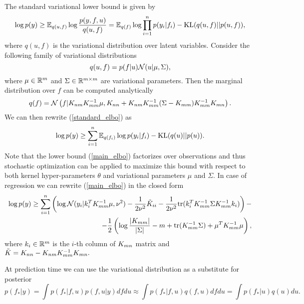   The standard variational lower bound is given by
  \begin{equation}
  \label{standard_elbo}
    \log p(y) \ge \mathbb{E}_{q(u, f)} \log \frac {p(y, f, u)} {q(u, f)} =
    \mathbb{E}_{q(f)} \log \prod_{i=1}^n p(y_i | f_i) - \mbox{KL}(q(u, f) || p(u, f)),
  \end{equation}
  where $q(u, f)$ is the variational distribution over latent variables.
  Consider the following family of variational distributions
  \begin{equation}
  \label{var_family}
    q(u, f) = p(f | u) \mathcal{N}(u | \mu, \Sigma),
  \end{equation}
  where $\mu \in \mathbb{R}^m$ and $\Sigma \in \mathbb{R}^{m \times m}$ are variational
  parameters. Then the marginal distribution over $f$ can be computed analytically
  \[
    q(f) = \mathcal{N}\left(f | K_{nm} K_{mm}^{-1} \mu, K_{nn} + K_{nm} K_{mm}^{-1} (\Sigma - K_{mm}) K_{mm}^{-1} K_{mn}\right).
  \]
  We can then rewrite (\ref{standard_elbo}) as
  \vspace{-0.3cm}
  \begin{equation}
  \label{main_elbo}
    \log p(y) \ge \sum_{i=1}^n \mathbb{E}_{q(f_i)} \log p(y_i | f_i) - \mbox{KL}(q(u) || p(u)).
  \end{equation}
  Note that the lower bound (\ref{main_elbo}) factorizes over observations and
  thus stochastic optimization can be applied to maximize this bound with respect
  to both kernel hyper-parameters $\theta$ and variational parameters $\mu$ and
  $\Sigma$. In case of regression we can rewrite (\ref{main_elbo}) in the closed
  form
  \begin{equation}
    \label{elbo_reg}
    \begin{split}
      \log p(y) \ge
      \sum_{i=1}^n \left ( \log \mathcal{N} (y_i | k_{i}^T K_{mm}^{-1} \mu, \nu^2) -
        \frac 1 {2\nu^2} \tilde K_{ii} -
        \frac 1 {2\nu^2} \mbox{tr} (k_{i}^T K_{mm}^{-1} \Sigma K_{mm}^{-1} k_{i})
      \right )-
      \\
      - \frac 1 2 \left(
        \log \frac {|K_{mm}|} {|\Sigma|} - m + \mbox{tr}(K_{mm}^{-1} \Sigma) +
        \mu^T K_{mm}^{-1} \mu
      \right),
    \end{split}
  \end{equation}
  where $k_{i} \in \mathbb{R}^m$ is the $i$-th column of $K_{mn}$ matrix and $\tilde{K} = K_{nn} - K_{nm} K_{mm}^{-1} K_{mn}.$
  
  At prediction time we can use the variational distribution as a substitute for
  posterior
  \[
    p(f_* | y) = \int p(f_*| f, u) p(f, u |y) d f d u \approx
    \int p(f_* | f, u) q(f, u) d f d u = \int p(f_* | u) q(u) du.
  \]


